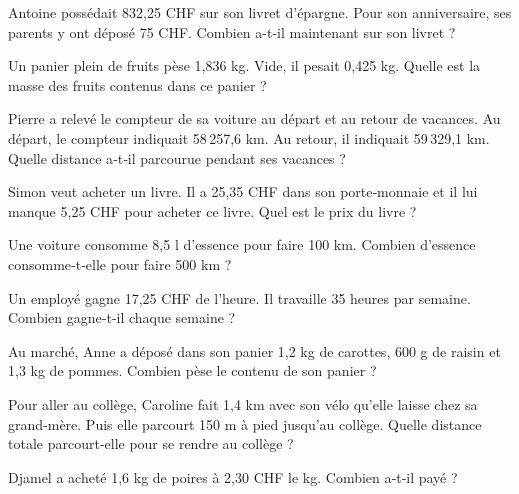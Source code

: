 \begin{exercice}
Antoine possédait 832,25 CHF sur son livret d'épargne. Pour son anniversaire, ses parents y ont déposé 75 CHF. Combien a-t-il maintenant sur son livret ?
\end{exercice}


\begin{exercice}
Un panier plein de fruits pèse 1,836 kg. Vide, il pesait 0,425 kg. Quelle est la masse des fruits contenus dans ce panier ?
\end{exercice}


\begin{exercice}
Pierre a relevé le compteur de sa voiture au départ et au retour de vacances. Au départ, le compteur indiquait 58\,257,6 km. Au retour, il indiquait 59\,329,1 km. Quelle distance a‑t‑il parcourue pendant ses vacances ?
\end{exercice}


\begin{exercice}
Simon veut acheter un livre. Il a 25,35 CHF dans son porte‑monnaie et il lui manque 5,25 CHF pour acheter ce livre. Quel est le prix du livre ?
\end{exercice}


\begin{exercice}
Une voiture consomme 8,5 l d'essence pour faire 100 km. Combien d'essence consomme‑t‑elle pour faire 500 km ?
\end{exercice}
  
  
\begin{exercice}
Un employé gagne 17,25 CHF de l'heure. Il travaille 35 heures par semaine. Combien gagne‑t‑il chaque semaine ?
\end{exercice}


\begin{exercice}
Au marché, Anne a déposé dans son panier 1,2 kg de carottes, 600 g de raisin et 1,3 kg de pommes. Combien pèse le contenu de son panier ?
\end{exercice}


\begin{exercice}
Pour aller au collège, Caroline fait 1,4 km avec son vélo qu'elle laisse chez sa grand‑mère. Puis elle parcourt 150 m à pied jusqu'au collège. Quelle distance totale parcourt‑elle pour se rendre au collège ?
\end{exercice}


\begin{exercice}
Djamel a acheté 1,6 kg de poires à 2,30 CHF le kg. Combien a‑t‑il payé ?
\end{exercice}


